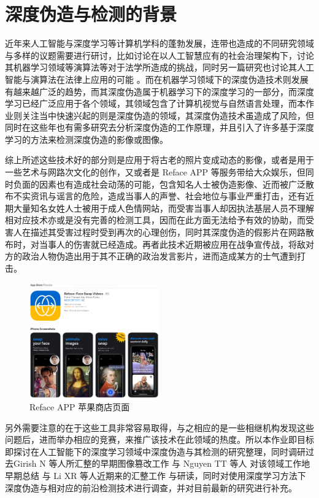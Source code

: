 \chapter{深度伪造与检测的背景}
\label{chap:1}
近年来人工智能与深度学习等计算机学科的蓬勃发展，连带也造成的不同研究领域与多样的议题需要进行研讨，比如讨论在以人工智慧应有的社会治理架构下，讨论其机器学习领域等演算法等对于法学所造成的挑战\cite{law01}，同时另一篇研究也讨论其人工智能与演算法在法律上应用的可能 \cite{law03}。而在机器学习领域下的深度伪造技术则发展有越来越广泛的趋势，而其深度伪造属于机器学习下的深度学习的一部分，而深度学习已经广泛应用于各个领域，其领域包含了计算机视觉与自然语言处理，而本作业则关注当中快速兴起的则是深度伪造的领域，其深度伪造技术\cite{list1101}虽造成了风险，但同时在这些年也有需多研究去分析深度伪造的工作原理，并且引入了许多基于深度学习的方法来检测深度伪造的影像或图像。

综上所述这些技术好的部分则是应用于将古老的照片变成动态的影像，或者是用于一些艺术与网路次文化的创作，又或者是 Reface APP\cite{list1102} 等服务带给大众娱乐，但同时负面的因素也有造成社会动荡的可能，包含知名人士被伪造影像、近而被广泛散布不实资讯与谣言的危险，造成当事人的声誉、社会地位与事业严重打击，还有近期大量知名女姓人士被用于成人色情网站，而受害当事人却因执法基层人员不理解相对应技术亦或是没有完善的检测工具，因而在此方面无法给予有效的协助，而受害人在描述其受害过程时受到再次的心理创伤，同时其深度伪造的假影片在网路散布时，对当事人的伤害就已经造成。再者此技术近期被应用在战争宣传战，将敌对方的政治人物伪造出用于其不正确的政治发言影片，进而造成某方的士气遭到打击。

\begin{figure}[htb]
\centering 
\includegraphics[width=0.50\textwidth]{img/ch1m1.png} 
\caption{Reface APP 苹果商店页面}
\label{Test}
\end{figure}

另外需要注意的在于这些工具非常容易取得，与之相应的是一些相继机构发现这些问题后，进而举办相应的竞赛\cite{list1103}，来推广该技术在此领域的热度。所以本作业即目标即探讨在人工智能下的深度学习领域中深度伪造与其检测的研究整理，同时调研过去Girish N 等人所汇整的早期图像篡改工作 \cite{girish2019review}与 Nguyen TT 等人 对该领域工作地早期总结 \cite{nguyen2019deep}与 Li XR 等人近期来的汇整工作\cite{2021496} 与研读，同时对使用深度学习方法下深度伪造与相对应的前沿检测技术进行调查，并对目前最新的研究进行补充。

